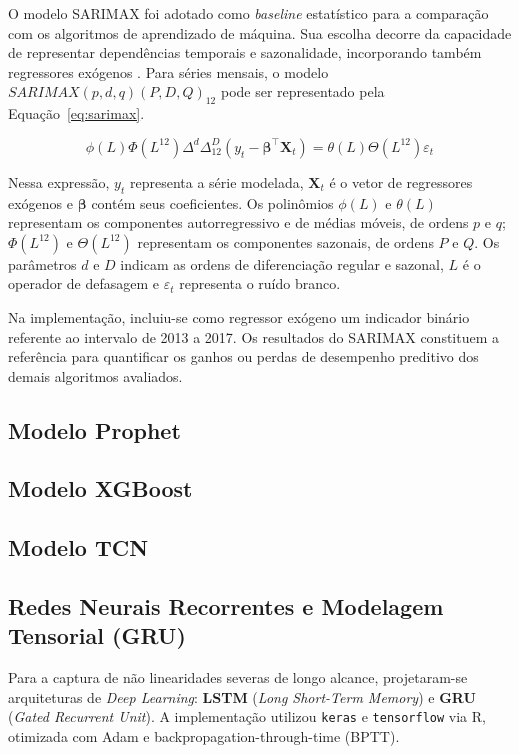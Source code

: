 \documentclass[12pt,a4paper]{article}
\begin{document}
O modelo SARIMAX foi adotado como \textit{baseline} estatístico para a comparação com os algoritmos de aprendizado de máquina. Sua escolha decorre da capacidade de representar dependências temporais e sazonalidade, incorporando também regressores exógenos \cite{hyndman2021forecasting}. Para séries mensais, o modelo $SARIMAX(p,d,q)(P,D,Q)_{12}$ pode ser representado pela Equação~\ref{eq:sarimax}.

\begin{equation}
\phi(L)\Phi(L^{12})\Delta^{d}\Delta_{12}^{D}
\left(y_t-\boldsymbol{\beta}^{\top}\mathbf{X}_t\right)
=
\theta(L)\Theta(L^{12})\varepsilon_t
\label{eq:sarimax}
\end{equation}

Nessa expressão, $y_t$ representa a série modelada,
$\mathbf{X}_t$ é o vetor de regressores exógenos e
$\boldsymbol{\beta}$ contém seus coeficientes.
Os polinômios $\phi(L)$ e $\theta(L)$ representam os componentes
autorregressivo e de médias móveis, de ordens $p$ e $q$;
$\Phi(L^{12})$ e $\Theta(L^{12})$ representam os componentes
sazonais, de ordens $P$ e $Q$. Os parâmetros $d$ e $D$
indicam as ordens de diferenciação regular e sazonal,
$L$ é o operador de defasagem e $\varepsilon_t$ representa o ruído branco.

Na implementação, incluiu-se como regressor exógeno um
indicador binário referente ao intervalo de 2013 a 2017.
Os resultados do SARIMAX constituem a referência para
quantificar os ganhos ou perdas de desempenho preditivo
dos demais algoritmos avaliados.

\subsection{Modelo Prophet}

\subsection{Modelo XGBoost}

\subsection{Modelo TCN}

\subsection{Redes Neurais Recorrentes e Modelagem Tensorial (GRU)}

Para a captura de não linearidades severas de longo alcance, projetaram-se arquiteturas de \textit{Deep Learning}: \textbf{LSTM} (\textit{Long Short-Term Memory}) e \textbf{GRU} (\textit{Gated Recurrent Unit}). A implementação utilizou \texttt{keras} e \texttt{tensorflow} via R, otimizada com Adam e backpropagation-through-time (BPTT).
\end{document}
